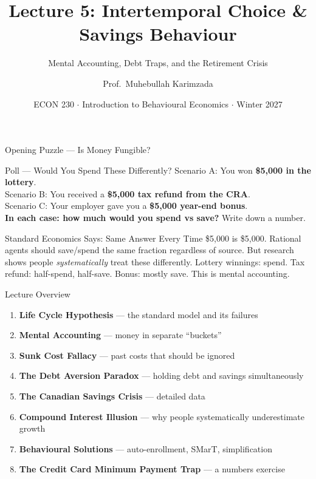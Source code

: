\documentclass[aspectratio=169]{beamer}
\title{\textbf{Lecture 5: Intertemporal Choice \& Savings Behaviour}}
\subtitle{Mental Accounting, Debt Traps, and the Retirement Crisis}
\author{Prof.\ Muhebullah Karimzada}
\institute{School of Economics, University of Northern British Columbia}
\date{ECON 230 $\cdot$ Introduction to Behavioural Economics $\cdot$ Winter 2027}
\begin{document}
\begin{frame}[plain]\titlepage\end{frame}

\begin{frame}{Opening Puzzle --- Is Money Fungible?}
\begin{alertblock}{Poll --- Would You Spend These Differently?}
Scenario A: You won \textbf{\$5,000 in the lottery}.\\[0.3em]
Scenario B: You received a \textbf{\$5,000 tax refund from the CRA}.\\[0.3em]
Scenario C: Your employer gave you a \textbf{\$5,000 year-end bonus}.\\[0.4em]
\textbf{In each case: how much would you spend vs save?} Write down a number.
\end{alertblock}
\pause
\begin{block}{Standard Economics Says: Same Answer Every Time}
\$5,000 is \$5,000. Rational agents should save/spend the same fraction regardless of source. But research shows people \textit{systematically} treat these differently. Lottery winnings: spend. Tax refund: half-spend, half-save. Bonus: mostly save. This is \alert{mental accounting}.
\end{block}
\end{frame}

\begin{frame}{Lecture Overview}
\begin{enumerate}[<+->]
  \item \textbf{Life Cycle Hypothesis} --- the standard model and its failures
  \item \textbf{Mental Accounting} --- money in separate ``buckets''
  \item \textbf{Sunk Cost Fallacy} --- past costs that should be ignored
  \item \textbf{The Debt Aversion Paradox} --- holding debt and savings simultaneously
  \item \textbf{The Canadian Savings Crisis} --- detailed data
  \item \textbf{Compound Interest Illusion} --- why people systematically underestimate growth
  \item \textbf{Behavioural Solutions} --- auto-enrollment, SMarT, simplification
  \item \textbf{The Credit Card Minimum Payment Trap} --- a numbers exercise
\end{enumerate}
\end{frame}
\end{document}

